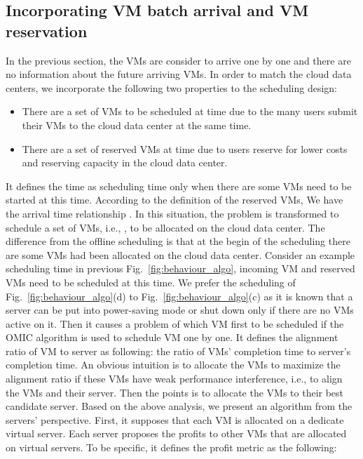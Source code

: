 \documentclass[10pt,journal]{IEEEtran}
\begin{document}
\subsection{Incorporating VM batch arrival and VM reservation}
In the previous section, the VMs are consider to arrive one by one and there are no information about the future arriving VMs. In order to match the cloud data centers, we incorporate the following two properties to the scheduling design:
\begin{itemize}
\item There are a set  of VMs to be scheduled at time  due to the many users submit their VMs to the cloud data center at the same time.
\item There are a set  of reserved VMs at time  due to users reserve for lower costs and reserving capacity in the cloud data center.  
\end{itemize}
It defines the time  as scheduling time only when there are some VMs need to be started at this time. According to the definition of the reserved VMs, We have the arrival time relationship . In this situation, the problem is transformed to schedule a set of VMs, i.e., , to be allocated on the cloud data center. The difference from the offline scheduling is that at the begin of the scheduling there are some VMs had been allocated on the cloud data center. Consider an example scheduling time  in previous Fig.~\ref{fig:behaviour_algo}, incoming VM  and reserved VMs  need to be scheduled at this time. We prefer the scheduling of Fig.~\ref{fig:behaviour_algo}(d) to Fig.~\ref{fig:behaviour_algo}(c) as it is known that a server can be put into power-saving mode or shut down only if there are no VMs active on it. Then it causes a problem of which VM first to be scheduled if the OMIC algorithm is used to schedule VM one by one. It defines the alignment ratio of VM to server as following: the ratio of VMs{'} completion time to server's completion time. An obvious intuition is to allocate the VMs to maximize the alignment ratio if these VMs have weak performance interference, i.e., to align the VMs and their server. Then the points is to allocate the VMs to their best candidate server. Based on the above analysis, we present an algorithm from the servers' perspective. First, it supposes that each VM  is allocated on a dedicate virtual server. Each server proposes the profits to other VMs that are allocated on virtual servers. To be specific, it defines the profit metric as the following:
\end{document}
